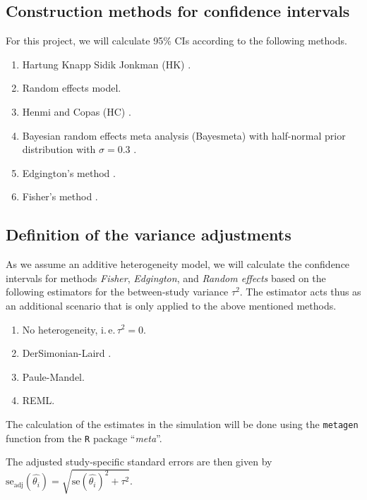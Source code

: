 \documentclass[letterpaper, 12pt]{article}
\newcommand{\ie}{{i.\,e.\,}}
\begin{document}
\subsection{Construction methods for confidence intervals} \label{sec:method}

For this project, we will calculate 95\% CIs according to the following methods.

\begin{enumerate}
  \item Hartung Knapp Sidik Jonkman (HK) \citep{IntHoutIoannidis}.
  \item Random effects model.
  \item Henmi and Copas (HC) \citep{henm:copa:10}.
  \item Bayesian random effects meta analysis (Bayesmeta) with half-normal prior
    distribution with $\sigma = 0.3$ \citep{rov:20, }.
  \item Edgington's method \citep{edgington:72}.
  \item Fisher's method \citep{fisher:34}.
\end{enumerate}

\subsection{Definition of the variance adjustments} \label{sec:varadj}

As we assume an additive heterogeneity model, we will calculate the confidence
intervals for methods \emph{Fisher}, \emph{Edgington}, and \emph{Random effects}
based on the following estimators for the between-study variance $\tau^2$. The
estimator acts thus as an additional scenario that is only applied to the above
mentioned methods.

\begin{enumerate}
  \item No heterogeneity, \ie $\tau^2 = 0$.
  \item DerSimonian-Laird \citep{ders:lair:86}.
  \item Paule-Mandel.
  \item REML.
\end{enumerate}

The calculation of the estimates in the simulation will be done using the
\texttt{metagen} function from the \texttt{R} package ``\emph{meta}''.

The adjusted study-specific standard errors are then given by
$\text{se}_{\text{adj}}(\hat{\theta_i}) = \sqrt{\text{se}(\hat{\theta_i})^2 + \tau^2}$.
\end{document}
